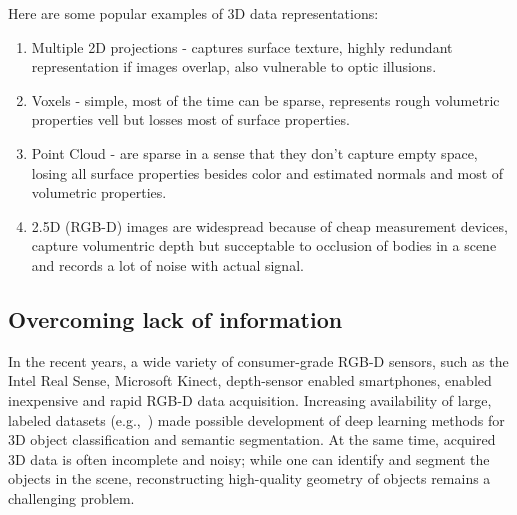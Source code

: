 Here are some popular examples of 3D data representations:
\begin{enumerate}
	\item Multiple 2D projections - captures surface texture, highly redundant representation if images overlap, also vulnerable to optic illusions.
	\item Voxels - simple, most of the time can be sparse, represents rough volumetric properties vell but losses most of surface properties.
	\item Point Cloud - are sparse in a sense that they don't capture empty space, losing all surface properties besides color and estimated normals and most of volumetric properties.
	\item 2.5D (RGB-D) images are widespread because of cheap measurement devices, capture volumentric depth but succeptable to occlusion of bodies in a scene and records a lot of noise with actual signal.
\end{enumerate}

\subsection{Overcoming lack of information}

In the recent years, a wide variety of consumer-grade RGB-D sensors, such as the Intel Real Sense, Microsoft Kinect, depth-sensor enabled smartphones, enabled inexpensive and rapid RGB-D data acquisition. Increasing availability of large, labeled datasets (e.g.,~\cite{chang2017matterport3d,dai2017scannet})  made possible development of deep learning methods for 3D object classification and semantic segmentation. At the same time, acquired 3D data is often incomplete and noisy; while one can identify and segment the objects in the scene, reconstructing high-quality geometry of objects remains a challenging problem.  

